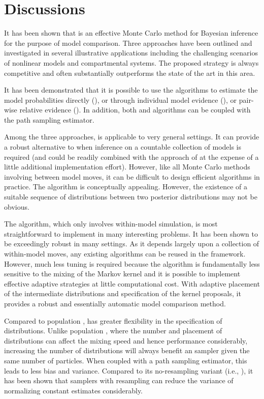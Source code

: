 \section{Discussions}
\label{sec:Bayesian SMC discussion}

It has been shown that \smc is an effective Monte Carlo method for Bayesian
inference for the purpose of model comparison. Three approaches have been
outlined and investigated in several illustrative applications including the
challenging scenarios of nonlinear \ode models and \pet compartmental systems.
The proposed strategy is always competitive and often substantially
outperforms the state of the art in this area.

It has been demonstrated that it is possible to use the \smc algorithms to
estimate the model probabilities directly (\smc[1]), or through individual
model evidence (\smc[2]), or pair-wise relative evidence (\smc[3]). In
addition, both \smc[2] and \smc[3] algorithms can be coupled with the path
sampling estimator.

Among the three approaches, \smc[1] is applicable to very general settings. It
can provide a robust alternative to \rjmcmc when inference on a countable
collection of models is required (and could be readily combined with the
approach of \cite{Jasra:2008bb} at the expense of a little additional
implementation effort). However, like all Monte Carlo methods involving
between model moves, it can be difficult to design efficient algorithms in
practice. The \smc[3] algorithm is conceptually appealing. However, the
existence of a suitable sequence of distributions between two posterior
distributions may not be obvious.

The \smc[2] algorithm, which only involves within-model simulation, is most
straightforward to implement in many interesting problems. It has been shown
to be exceedingly robust in many settings. As it depends largely upon a
collection of within-model \mcmc moves, any existing \mcmc algorithms can be
reused in the \smc[2] framework. However, much less tuning is required because
the algorithm is fundamentally less sensitive to the mixing of the Markov
kernel and it is possible to implement effective adaptive strategies at little
computational cost. With adaptive placement of the intermediate distributions
and specification of the \mcmc kernel proposals, it provides a robust and
essentially automatic model comparison method.

Compared to population \mcmc, \smc[2] has greater flexibility in
the specification of distributions. Unlike population \mcmc, where the number
and placement of distributions can affect the mixing speed and hence
performance considerably, increasing the number of distributions will always
benefit an \smc sampler given the same number of particles. When coupled with a
path sampling estimator, this leads to less bias and variance. Compared to its
no-resampling variant (i.e., \aic), it has been shown that \smc samplers with
resampling can reduce the variance of normalizing constant estimates
considerably.

